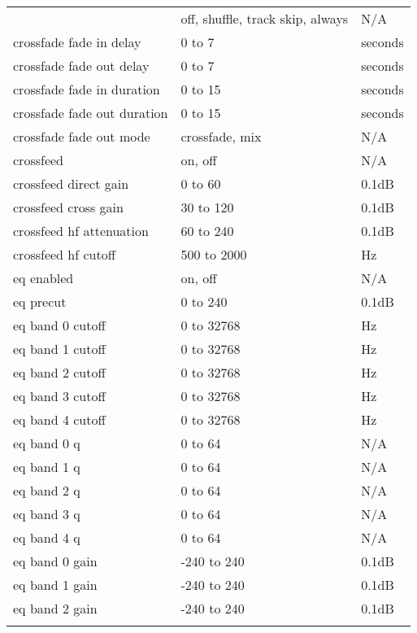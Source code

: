 \begin{center}
\begin{longtable}{@{}>{\raggedright}p{}@{}>{\raggedright}p{}@{}p{}@{}}
{%
      crossfade     & off, shuffle, track skip, always
                                        & N/A\\
      crossfade fade in delay
                    & 0 to 7            & seconds\\
      crossfade fade out delay
                    & 0 to 7            & seconds\\
      crossfade fade in duration
                    & 0 to 15           & seconds\\
      crossfade fade out duration
                    & 0 to 15           & seconds\\
      crossfade fade out mode
                    & crossfade, mix    & N/A\\
%
      crossfeed     & on, off           & N/A\\
      crossfeed direct gain
                    & 0 to 60           & 0.1dB\\
      crossfeed cross gain
                    & 30 to 120         & 0.1dB\\
      crossfeed hf attenuation
                    & 60 to 240         & 0.1dB\\
      crossfeed hf cutoff
                    & 500 to 2000       & Hz\\
%
      eq enabled    & on, off           & N/A\\
      eq precut     & 0 to 240          & 0.1dB\\
      eq band 0 cutoff & 0 to 32768     & Hz\\
      eq band 1 cutoff & 0 to 32768     & Hz\\
      eq band 2 cutoff & 0 to 32768     & Hz\\
      eq band 3 cutoff & 0 to 32768     & Hz\\
      eq band 4 cutoff & 0 to 32768     & Hz\\
      eq band 0 q   & 0 to 64           & N/A\\
      eq band 1 q   & 0 to 64           & N/A\\
      eq band 2 q   & 0 to 64           & N/A\\
      eq band 3 q   & 0 to 64           & N/A\\
      eq band 4 q   & 0 to 64           & N/A\\
      eq band 0 gain & -240 to 240      & 0.1dB\\
      eq band 1 gain & -240 to 240      & 0.1dB\\
      eq band 2 gain & -240 to 240      & 0.1dB\\
}
\end{longtable}
\end{center}
